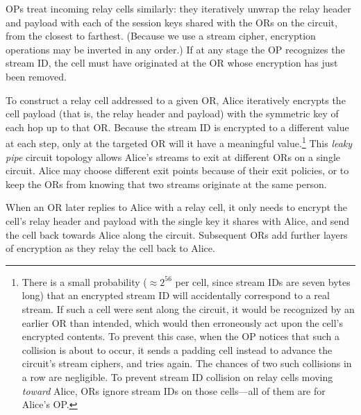 \documentclass[times,10pt,twocolumn]{article}
\begin{document}
OPs treat incoming relay cells similarly: they iteratively unwrap the
relay header and payload with each of the session keys shared with the 
ORs on the circuit, from the closest to farthest.  (Because we use a
stream cipher, encryption operations may be inverted in any order.)
If at any stage the OP recognizes the stream ID, the cell must have
originated at the OR whose encryption has just been removed.

To construct a relay cell addressed to a given OR, Alice iteratively
encrypts the cell payload (that is, the relay header and payload) with
the symmetric key of each hop up to that OR.  Because the stream ID is
encrypted to a different value at each step, only at the targeted OR
will it have a meaningful value.\footnote{
  There is a small probability ($\approx 2^56$ per cell, since stream
  IDs are seven bytes long) that an encrypted stream ID will
  accidentally correspond to a real stream.  If such a cell were sent
  along the circuit, it would be recognized by an earlier OR than
  intended, which would then erroneously act upon the cell's encrypted
  contents.  To prevent this case, when the OP notices that such a
  collision is about to occur, it sends a padding cell instead to
  advance the circuit's stream ciphers, and tries again.  The chances
  of two such collisions in a row are negligible.  To prevent stream
  ID collision on relay cells moving \emph{toward} Alice, ORs ignore
  stream IDs on those cells---all of them are for Alice's OP.
}
This \emph{leaky pipe} circuit topology
allows Alice's streams to exit at different ORs on a single circuit.  
Alice may choose different exit points because of their exit policies,
or to keep the ORs from knowing that two streams
originate at the same person.

When an OR later replies to Alice with a relay cell, it only needs to
encrypt the cell's relay header and payload with the single key it
shares with Alice, and send the cell back towards Alice along the
circuit.  Subsequent ORs add further layers of encryption as they
relay the cell back to Alice.
\end{document}
